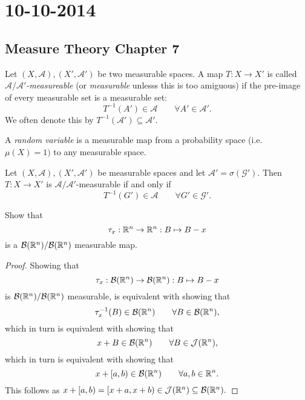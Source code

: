 \section{10-10-2014}
\subsection{Measure Theory Chapter 7}
\begin{defn}
Let \((X,\mathcal{A}),(X',\mathcal{A}')\) be two measurable spaces. A map \(T:X\rightarrow X'\) is called \emph{\(\mathcal{A}/\mathcal{A}'\)-measureable} (or \emph{measurable} unlesss this is too amiguous) if the pre-image of every measurable set is a measurable set:
\[
T^{-1}(A')\in \mathcal{A} \qquad \forall A'\in \mathcal{A}'.
\]
We often denote this by \(T^{-1}(\mathcal{A}')\subseteq \mathcal{A}'\).
\end{defn}

\begin{defn}
A \emph{random variable} is a measurable map from a probability space (i.e. \(\mu (X)=1)\) to any measurable space.
\end{defn}

\begin{thm}[Lemma 7.2]
Let \((X,\mathcal{A}),(X',\mathcal{A}')\) be measurable spaces and let \(\mathcal{A}'= \sigma (\mathcal{G}').\) Then \(T:X\rightarrow X'\) is \(\mathcal{A}/\mathcal{A}'\)-measurable if and only if
\[
T^{-1}(G')\in \mathcal{A} \qquad \forall G'\in \mathcal{G}'.
\]
\end{thm}

\begin{thm}[Problem 7.1]
Show that
\[
\tau _{x}:\Bbb{R}^n \rightarrow \Bbb{R}^n : B\mapsto B-x 
\]
is a \(\mathcal{B}(\Bbb{R}^n)/\mathcal{B}(\Bbb{R}^n)\) measurable map.
\end{thm}

\begin{proof}
Showing that
\[
\tau _{x}:\mathcal{B}(\Bbb{R}^n) \rightarrow \mathcal{B}(\Bbb{R}^n) : B\mapsto B-x
\]
is \(\mathcal{B}(\Bbb{R}^n)/\mathcal{B}(\Bbb{R}^n)\) measurable, is equivalent with showing that
\[
\tau _{x}^{-1}(B)\in \mathcal{B}(\Bbb{R}^n) \qquad \forall B\in \mathcal{B}(\Bbb{R}^n),
\]
which in turn is equivalent with showing that
\[
x+B\in \mathcal{B}(\Bbb{R}^n) \qquad \forall B\in \mathcal{J}(\Bbb{R}^n),
\]
which in turn is equivalent with showing that
\[
x+[a,b)\in \mathcal{B}(\Bbb{R}^n) \qquad \forall a,b\in \Bbb{R}^n.
\]
This follows as \(x+[a,b)=[x+a,x+b)\in \mathcal{J}(\Bbb{R}^n)\subseteq \mathcal{B}(\Bbb{R}^n).\)
\end{proof}

